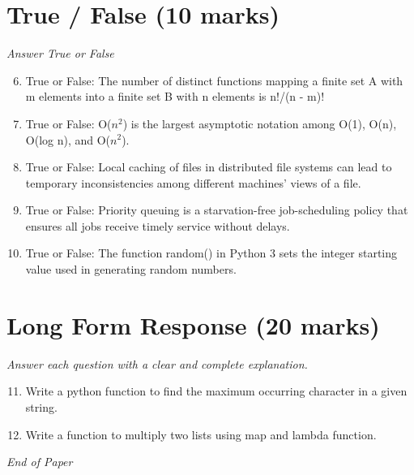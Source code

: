 \documentclass[12pt]{article}
\begin{document}
\section*{True / False (10 marks)}
\textit{Answer True or False}
\begin{enumerate}[label=\arabic*.]
\setcounter{enumi}{5}
\item True or False: The number of distinct functions mapping a finite set A with m elements into a finite set B with n elements is n!/(n - m)!
\item True or False: O($n^2$) is the largest asymptotic notation among O(1), O(n), O(log n), and O($n^2$).
\item True or False: Local caching of files in distributed file systems can lead to temporary inconsistencies among different machines' views of a file.
\item True or False: Priority queuing is a starvation-free job-scheduling policy that ensures all jobs receive timely service without delays.
\item True or False: The function random() in Python 3 sets the integer starting value used in generating random numbers.
\end{enumerate}

\section*{Long Form Response (20 marks)}
\textit{Answer each question with a clear and complete explanation.}
\begin{enumerate}[label=\arabic*.]
\setcounter{enumi}{10}
\item Write a python function to find the maximum occurring character in a given string.
\item Write a function to multiply two lists using map and lambda function.
\end{enumerate}

\vfill
\noindent\textit{End of Paper}
\end{document}
